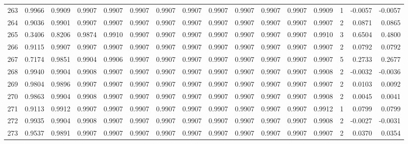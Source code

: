 \begin{tabular}{lrrrrrrrrrrrrrrr}
263 &      0.9966 &  0.9909 &  0.9907 &  0.9907 &  0.9907 &  0.9907 &  0.9907 &  0.9907 &  0.9907 &  0.9907 &   0.9907 &     0.9909 &      1 &                   -0.0057 &                    -0.0057 \\
264 &      0.9036 &  0.9901 &  0.9907 &  0.9907 &  0.9907 &  0.9907 &  0.9907 &  0.9907 &  0.9907 &  0.9907 &   0.9907 &     0.9907 &      2 &                    0.0871 &                     0.0865 \\
265 &      0.3406 &  0.8206 &  0.9874 &  0.9910 &  0.9907 &  0.9907 &  0.9907 &  0.9907 &  0.9907 &  0.9907 &   0.9907 &     0.9910 &      3 &                    0.6504 &                     0.4800 \\
266 &      0.9115 &  0.9907 &  0.9907 &  0.9907 &  0.9907 &  0.9907 &  0.9907 &  0.9907 &  0.9907 &  0.9907 &   0.9907 &     0.9907 &      2 &                    0.0792 &                     0.0792 \\
267 &      0.7174 &  0.9851 &  0.9904 &  0.9906 &  0.9907 &  0.9907 &  0.9907 &  0.9907 &  0.9907 &  0.9907 &   0.9907 &     0.9907 &      5 &                    0.2733 &                     0.2677 \\
268 &      0.9940 &  0.9904 &  0.9908 &  0.9907 &  0.9907 &  0.9907 &  0.9907 &  0.9907 &  0.9907 &  0.9907 &   0.9907 &     0.9908 &      2 &                   -0.0032 &                    -0.0036 \\
269 &      0.9804 &  0.9896 &  0.9907 &  0.9907 &  0.9907 &  0.9907 &  0.9907 &  0.9907 &  0.9907 &  0.9907 &   0.9907 &     0.9907 &      2 &                    0.0103 &                     0.0092 \\
270 &      0.9863 &  0.9904 &  0.9908 &  0.9907 &  0.9907 &  0.9907 &  0.9907 &  0.9907 &  0.9907 &  0.9907 &   0.9907 &     0.9908 &      2 &                    0.0045 &                     0.0041 \\
271 &      0.9113 &  0.9912 &  0.9907 &  0.9907 &  0.9907 &  0.9907 &  0.9907 &  0.9907 &  0.9907 &  0.9907 &   0.9907 &     0.9912 &      1 &                    0.0799 &                     0.0799 \\
272 &      0.9935 &  0.9904 &  0.9908 &  0.9907 &  0.9907 &  0.9907 &  0.9907 &  0.9907 &  0.9907 &  0.9907 &   0.9907 &     0.9908 &      2 &                   -0.0027 &                    -0.0031 \\
273 &      0.9537 &  0.9891 &  0.9907 &  0.9907 &  0.9907 &  0.9907 &  0.9907 &  0.9907 &  0.9907 &  0.9907 &   0.9907 &     0.9907 &      2 &                    0.0370 &                     0.0354 \\

\end{tabular}

